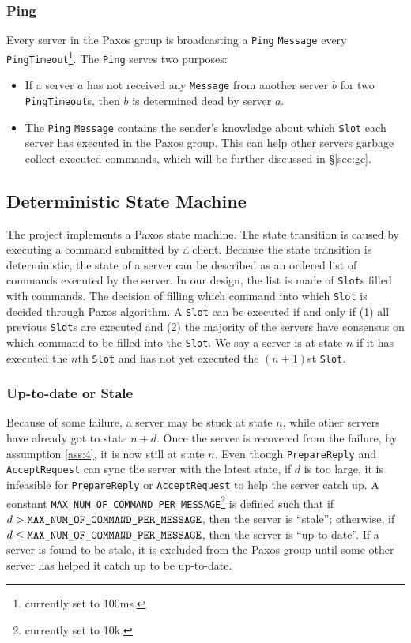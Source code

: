 \documentclass{article}
\numberwithin{equation}{section}
\begin{document}
\subsubsection{Ping}
Every server in the Paxos group is broadcasting a \verb|Ping| \verb|Message| every \verb|PingTimeout|\footnote{currently set to 100ms.}. The \verb|Ping| serves two purposes:
\begin{itemize}
	\item If a server $a$ has not received any \verb|Message| from another server $b$ for two \verb|PingTimeout|s, then $b$ is determined dead by server $a$.
	\item The \verb|Ping| \verb|Message| contains the sender's knowledge about which \verb|Slot| each server has executed in the Paxos group. This can help other servers garbage collect executed commands, which will be further discussed in \S\ref{sec:gc}.
\end{itemize}

\subsection{Deterministic State Machine}
The project implements a Paxos state machine. The state transition is caused by executing a command submitted by a client. Because the state transition is deterministic, the state of a server can be described as an ordered list of commands executed by the server. In our design, the list is made of \verb|Slot|s filled with commands. The decision of filling which command into which \verb|Slot| is decided through Paxos algorithm. A \verb|Slot| can be executed if and only if (1) all previous \verb|Slot|s are executed and (2) the majority of the servers have consensus on which command to be filled into the \verb|Slot|. We say a server is at state $n$ if it has executed the $n$th \verb|Slot| and has not yet executed the $(n+1)$st \verb|Slot|.

\subsubsection{Up-to-date or Stale}
Because of some failure, a server may be stuck at state $n$, while other servers have already got to state $n+d$. Once the server is recovered from the failure, by assumption \ref{ass:4}, it is now still at state $n$. Even though \verb|PrepareReply| and \verb|AcceptRequest| can sync the server with the latest state, if $d$ is too large, it is infeasible for \verb|PrepareReply| or \verb|AcceptRequest| to help the server catch up. A constant \verb|MAX_NUM_OF_COMMAND_PER_MESSAGE|\footnote{currently set to 10k.} is defined such that if $d>\verb|MAX_NUM_OF_COMMAND_PER_MESSAGE|$, then the server is ``stale''; otherwise, if $d\leq\verb|MAX_NUM_OF_COMMAND_PER_MESSAGE|$, then the server is ``up-to-date''. If a server is found to be stale, it is excluded from the Paxos group until some other server has helped it catch up to be up-to-date.\\
\end{document}
